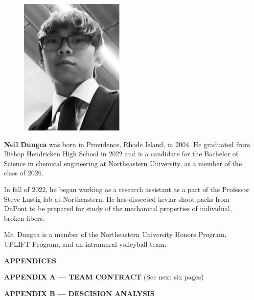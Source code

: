 \documentclass[conference]{IEEEtran}
\begin{document}
  \begin{figure}
    \includegraphics[width=.175\textwidth]{Figures/DungcaImage.png}
  \end{figure}
  \par \textbf{Neil Dungca} was born in Providence, Rhode Island, in 2004.  He graduated from Bishop Hendricken High School in 2022 and is a candidate for the Bachelor of Science in chemical engineering at Northeastern University, as a member of the class of 2026.  
\par In fall of 2022, he began working as a research assistant as a part of the Professor Steve Lustig lab at Northeastern.  He has dissected kevlar shoot packs from DuPont to be prepared for study of the mechanical properties of individual, broken fibers.  
\par Mr. Dungca is a member of the Northeastern University Honors Program, UPLIFT Program, and an intramural volleyball team.

\onecolumn


  \LARGE \textbf{APPENDICES}  

  \newpage


\Large \hspace{.5in} \textbf{APPENDIX A — TEAM CONTRACT}
\normalsize (See next six pages) \Large




   \hspace{.5in} \textbf{APPENDIX B — DESCISION ANALYSIS}  
\end{document}
